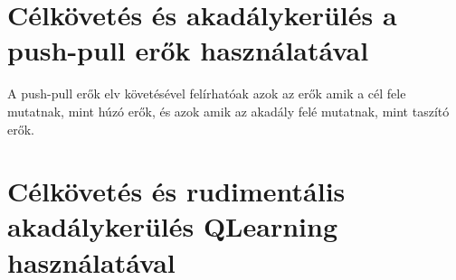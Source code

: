\section{Célkövetés és akadálykerülés a push-pull erők használatával}

A push-pull erők elv követésével felírhatóak azok az erők amik a cél fele mutatnak, mint húzó erők, és azok amik az akadály felé mutatnak, mint taszító erők.


\section{Célkövetés és rudimentális akadálykerülés QLearning használatával}

\subsection{}
